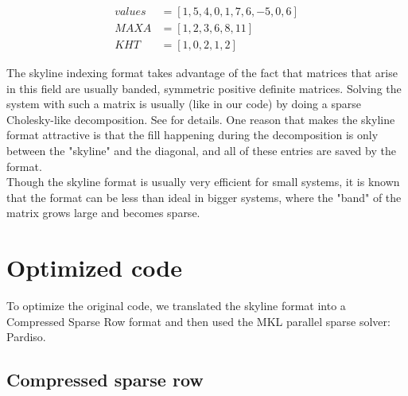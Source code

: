 \documentclass[11pt]{article}
\begin{document}
\begin{align}
values&=[1, 5, 4, 0, 1, 7, 6, -5, 0, 6]\\
MAXA&= [1, 2, 3, 6, 8, 11] \\
KHT&=[1, 0, 2, 1, 2]
\end{align}

 
The skyline indexing format takes advantage of the fact that matrices that arise in this field are usually banded, symmetric positive definite matrices. Solving the system with such a matrix is usually (like in our code) by doing a sparse Cholesky-like decomposition. See \cite{Bathe} for details. One reason that makes the skyline format attractive is that the fill happening during the decomposition is only between the "skyline" and the diagonal, and all of these entries are saved by the format.\\ 
 
Though the skyline format is usually very efficient for small systems, it is known that the format can be less than ideal in bigger systems, where the "band" of the matrix grows large and becomes  sparse.

\section{Optimized code}\label{sec:newCode}
To optimize the original code, we translated the skyline format into a Compressed Sparse Row format and then used the MKL parallel sparse solver: Pardiso.

\subsection{Compressed sparse row}
\end{document}
